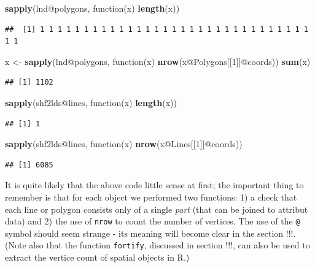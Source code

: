 \documentclass[]{article}
\newenvironment{Shaded}{}{}
\newcommand{\KeywordTok}[1]{\textcolor[rgb]{0.00,0.44,0.13}{\textbf{{#1}}}}
\newcommand{\DecValTok}[1]{\textcolor[rgb]{0.25,0.63,0.44}{{#1}}}
\newcommand{\NormalTok}[1]{{#1}}
\begin{document}
\begin{Shaded}
\begin{Highlighting}[]
\KeywordTok{sapply}\NormalTok{(lnd@polygons, function(x) }\KeywordTok{length}\NormalTok{(x))}
\end{Highlighting}
\end{Shaded}
\begin{verbatim}
##  [1] 1 1 1 1 1 1 1 1 1 1 1 1 1 1 1 1 1 1 1 1 1 1 1 1 1 1 1 1 1 1 1 1 1
\end{verbatim}
\begin{Shaded}
\begin{Highlighting}[]
\NormalTok{x <- }\KeywordTok{sapply}\NormalTok{(lnd@polygons, function(x) }\KeywordTok{nrow}\NormalTok{(x@Polygons[[}\DecValTok{1}\NormalTok{]]@coords))}
\KeywordTok{sum}\NormalTok{(x)}
\end{Highlighting}
\end{Shaded}
\begin{verbatim}
## [1] 1102
\end{verbatim}
\begin{Shaded}
\begin{Highlighting}[]

\KeywordTok{sapply}\NormalTok{(shf2lds@lines, function(x) }\KeywordTok{length}\NormalTok{(x))}
\end{Highlighting}
\end{Shaded}
\begin{verbatim}
## [1] 1
\end{verbatim}
\begin{Shaded}
\begin{Highlighting}[]
\KeywordTok{sapply}\NormalTok{(shf2lds@lines, function(x) }\KeywordTok{nrow}\NormalTok{(x@Lines[[}\DecValTok{1}\NormalTok{]]@coords))}
\end{Highlighting}
\end{Shaded}
\begin{verbatim}
## [1] 6085
\end{verbatim}
It is quite likely that the above code little sense at first; the
important thing to remember is that for each object we performed two
functions: 1) a check that each line or polygon consists only of a
single \emph{part} (that can be joined to attribut data) and 2) the use
of \texttt{nrow} to count the number of vertices. The use of the
\texttt{@} symbol should seem strange - its meaning will become clear in
the section !!!. (Note also that the function \texttt{fortify},
discussed in section !!!, can also be used to extract the vertice count
of spatial objects in R.)
\end{document}
